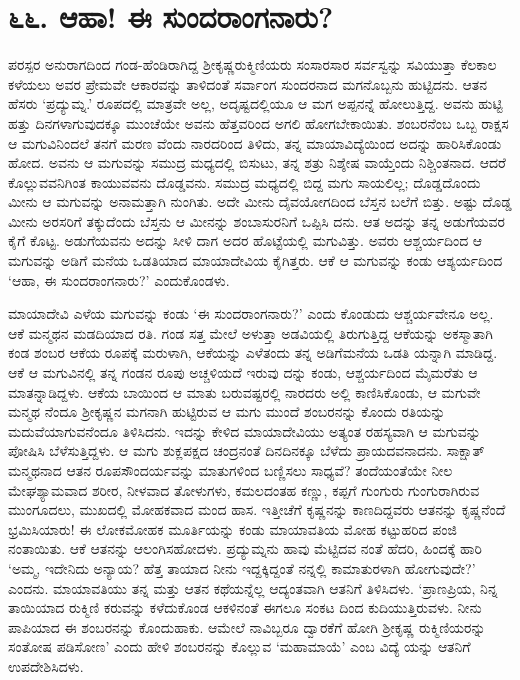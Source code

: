 
\chapter{೬೬. ಆಹಾ! ಈ ಸುಂದರಾಂಗನಾರು?}

ಪರಸ್ಪರ ಅನುರಾಗದಿಂದ ಗಂಡ-ಹೆಂಡಿರಾಗಿದ್ದ ಶ್ರೀಕೃಷ್ಣರುಕ್ಮಿಣಿಯರು ಸಂಸಾರಸಾರ ಸರ್ವಸ್ವನ್ನು ಸವಿಯುತ್ತಾ ಕೆಲಕಾಲ ಕಳೆಯಲು ಅವರ ಪ್ರೇಮವೇ ಆಕಾರವನ್ನು ತಾಳಿದಂತೆ ಸರ್ವಾಂಗ ಸುಂದರನಾದ ಮಗನೊಬ್ಬನು ಹುಟ್ಟಿದನು. ಆತನ ಹೆಸರು ‘ಪ್ರದ್ಯುಮ್ನ.’ ರೂಪದಲ್ಲಿ ಮಾತ್ರವೇ ಅಲ್ಲ, ಅದೃಷ್ಟದಲ್ಲಿಯೂ ಆ ಮಗ ಅಪ್ಪನನ್ನೆ ಹೋಲುತ್ತಿದ್ದ. ಅವನು ಹುಟ್ಟಿ ಹತ್ತು ದಿನಗಳಾಗುವುದಕ್ಕೂ ಮುಂಚೆಯೇ ಅವನು ಹೆತ್ತವರಿಂದ ಅಗಲಿ ಹೋಗಬೇಕಾಯಿತು. ಶಂಬರನೆಂಬ ಒಬ್ಬ ರಾಕ್ಷಸ ಆ ಮಗುವಿನಿಂದಲೆ ತನಗೆ ಮರಣ ವೆಂದು ನಾರದರಿಂದ ತಿಳಿದು, ತನ್ನ ಮಾಯಾವಿದ್ಯೆಯಿಂದ ಅದನ್ನು ಹಾರಿಸಿಕೊಂಡು ಹೋದ. ಅವನು ಆ ಮಗುವನ್ನು ಸಮುದ್ರ ಮಧ್ಯದಲ್ಲಿ ಬಿಸುಟು, ತನ್ನ ಶತ್ರು ನಿಶ್ಶೇಷ ವಾಯ್ತೆಂದು ನಿಶ್ಚಿಂತನಾದ. ಆದರೆ ಕೊಲ್ಲುವವನಿಗಿಂತ ಕಾಯುವವನು ದೊಡ್ಡವನು. ಸಮುದ್ರ ಮಧ್ಯದಲ್ಲಿ ಬಿದ್ದ ಮಗು ಸಾಯಲಿಲ್ಲ; ದೊಡ್ಡದೊಂದು ಮೀನು ಆ ಮಗುವನ್ನು ಅನಾಮತ್ತಾಗಿ ನುಂಗಿತು. ಅದೇ ಮೀನು ದೈವಯೋಗದಿಂದ ಬೆಸ್ತನ ಬಲೆಗೆ ಬಿತ್ತು. ಅಷ್ಟು ದೊಡ್ಡ ಮೀನು ಅರಸರಿಗೆ ತಕ್ಕುದೆಂದು ಬೆಸ್ತನು ಆ ಮೀನನ್ನು ಶಂಬಾಸುರನಿಗೆ ಒಪ್ಪಿಸಿ ದನು. ಆತ ಅದನ್ನು ತನ್ನ ಅಡುಗೆಯವರ ಕೈಗೆ ಕೊಟ್ಟ. ಅಡುಗೆಯವನು ಅದನ್ನು ಸೀಳಿ ದಾಗ ಅದರ ಹೊಟ್ಟೆಯಲ್ಲಿ ಮಗುವಿತ್ತು. ಅವರು ಆಶ್ಚರ್ಯದಿಂದ ಆ ಮಗುವನ್ನು ಅಡಿಗೆ ಮನೆಯ ಒಡತಿಯಾದ ಮಾಯಾದೇವಿಯ ಕೈಗಿತ್ತರು. ಆಕೆ ಆ ಮಗುವನ್ನು ಕಂಡು ಆಶ್ಯರ್ಯದಿಂದ ‘ಆಹಾ, ಈ ಸುಂದರಾಂಗನಾರು?’ ಎಂದುಕೊಂಡಳು.

ಮಾಯಾದೇವಿ ಎಳೆಯ ಮಗುವನ್ನು ಕಂಡು ‘ಈ ಸುಂದರಾಂಗನಾರು?’ ಎಂದು ಕೊಂಡುದು ಆಶ್ಚರ್ಯವೇನೂ ಅಲ್ಲ. ಆಕೆ ಮನ್ಮಥನ ಮಡದಿಯಾದ ರತಿ. ಗಂಡ ಸತ್ತ ಮೇಲೆ ಅಳುತ್ತಾ ಅಡವಿಯಲ್ಲಿ ತಿರುಗುತ್ತಿದ್ದ ಆಕೆಯನ್ನು ಅಕಸ್ಮಾತಾಗಿ ಕಂಡ ಶಂಬರ ಆಕೆಯ ರೂಪಕ್ಕೆ ಮರುಳಾಗಿ, ಆಕೆಯನ್ನು ಎಳೆತಂದು ತನ್ನ ಅಡಿಗೆಮನೆಯ ಒಡತಿ ಯನ್ನಾಗಿ ಮಾಡಿದ್ದ. ಆಕೆ ಆ ಮಗುವಿನಲ್ಲಿ ತನ್ನ ಗಂಡನ ರೂಪು ಅಚ್ಚಳಿಯದೆ ಇರುವು ದನ್ನು ಕಂಡು, ಆಶ್ಚರ್ಯದಿಂದ ಮೈಮರೆತು ಆ ಮಾತನ್ನಾಡಿದ್ದಳು. ಆಕೆಯ ಬಾಯಿಂದ ಆ ಮಾತು ಬರುವಷ್ಟರಲ್ಲಿ ನಾರದರು ಅಲ್ಲಿ ಕಾಣಿಸಿಕೊಂಡು, ಆ ಮಗುವೇ ಮನ್ಮಥ ನೆಂದೂ ಶ್ರೀಕೃಷ್ಣನ ಮಗನಾಗಿ ಹುಟ್ಟಿರುವ ಆ ಮಗು ಮುಂದೆ ಶಂಬರನನ್ನು ಕೊಂದು ರತಿಯನ್ನು ಮದುವೆಯಾಗುವನೆಂದೂ ತಿಳಿಸಿದನು. ಇದನ್ನು ಕೇಳಿದ ಮಾಯಾದೇವಿಯು ಅತ್ಯಂತ ರಹಸ್ಯವಾಗಿ ಆ ಮಗುವನ್ನು ಪೋಷಿಸಿ ಬೆಳೆಸುತ್ತಿದ್ದಳು. ಆ ಮಗು ಶುಕ್ಲಪಕ್ಷದ ಚಂದ್ರನಂತೆ ದಿನದಿನಕ್ಕೂ ಬೆಳೆದು ಪ್ರಾಯದವನಾದನು. ಸಾಕ್ಷಾತ್ ಮನ್ಮಥನಾದ ಆತನ ರೂಪಸೌಂದರ್ಯವನ್ನು ಮಾತುಗಳಿಂದ ಬಣ್ಣಿಸಲು ಸಾಧ್ಯವೆ? ತಂದೆಯಂತೆಯೇ ನೀಲ ಮೇಘಶ್ಯಾಮವಾದ ಶರೀರ, ನೀಳವಾದ ತೋಳುಗಳು, ಕಮಲದಂತಹ ಕಣ್ಣು, ಕಪ್ಪಗೆ ಗುಂಗುರು ಗುಂಗುರಾಗಿರುವ ಮುಂಗೂದಲು, ಮುಖದಲ್ಲಿ ಮೋಹಕವಾದ ಮಂದ ಹಾಸ. ಇತ್ತೀಚೆಗೆ ಕೃಷ್ಣನನ್ನು ಕಾಣದಿದ್ದವರು ಆತನನ್ನು ಕೃಷ್ಣನೆಂದೆ ಭ್ರಮಿಸಿಯಾರು! ಈ ಲೋಕಮೋಹಕ ಮೂರ್ತಿಯನ್ನು ಕಂಡು ಮಾಯಾವತಿಯ ಮೋಹ ಕಟ್ಟುಹರಿದ ಪಂಜಿ ನಂತಾಯಿತು. ಆಕೆ ಆತನನ್ನು ಆಲಂಗಿಸಹೋದಳು. ಪ್ರದ್ಯುಮ್ನನು ಹಾವು ಮೆಟ್ಟಿದವ ನಂತೆ ಹೆದರಿ, ಹಿಂದಕ್ಕೆ ಹಾರಿ ‘ಅಮ್ಮ, ಇದೇನಿದು ಅನ್ಯಾಯ? ಹೆತ್ತ ತಾಯಾದ ನೀನು ಇದ್ದಕ್ಕಿದ್ದಂತೆ ನನ್ನಲ್ಲಿ ಕಾಮಾತುರಳಾಗಿ ಹೋಗುವುದೇ?’ ಎಂದನು. ಮಾಯಾವತಿಯು ತನ್ನ ಮತ್ತು ಆತನ ಕಥೆಯನ್ನೆಲ್ಲ ಆದ್ಯಂತವಾಗಿ ಆತನಿಗೆ ತಿಳಿಸಿದಳು. ‘ಪ್ರಾಣಪ್ರಿಯ, ನಿನ್ನ ತಾಯಿಯಾದ ರುಕ್ಮಿಣಿ ಕರುವನ್ನು ಕಳೆದುಕೊಂಡ ಆಕಳಿನಂತೆ ಈಗಲೂ ಸಂಕಟ ದಿಂದ ಕುದಿಯುತ್ತಿರುವಳು. ನೀನು ಪಾಪಿಯಾದ ಈ ಶಂಬರನನ್ನು ಕೊಂದುಹಾಕು. ಆಮೇಲೆ ನಾವಿಬ್ಬರೂ ದ್ವಾರಕೆಗೆ ಹೋಗಿ ಶ್ರೀಕೃಷ್ಣ ರುಕ್ಮಿಣಿಯರನ್ನು ಸಂತೋಷ ಪಡಿಸೋಣ’ ಎಂದು ಹೇಳಿ ಶಂಬರನನ್ನು ಕೊಲ್ಲುವ ‘ಮಹಾಮಾಯೆ’ ಎಂಬ ವಿದ್ಯೆ ಯನ್ನು ಆತನಿಗೆ ಉಪದೇಶಿಸಿದಳು.

